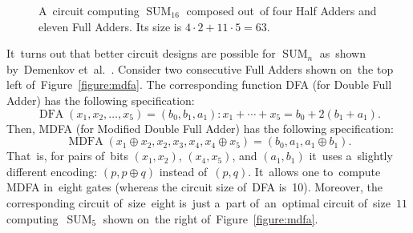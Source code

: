 \documentclass[sigconf, review, anonymous]{acmart}
\DeclareMathOperator{\SUM}{SUM}
\DeclareMathOperator{\MDFA}{MDFA}
\begin{document}
\begin{figure}
    \begin{center}
    \end{center}
    \caption{A~circuit computing $\SUM_{16}$ composed out~of four Half Adders and eleven Full Adders. Its size is $4 \cdot 2 + 11 \cdot 5=63$.}
    \label{figure:sum16fa}
\end{figure}

It~turns out that better circuit designs are possible for $\SUM_n$
as~shown by~Demenkov et~al.~\cite{DBLP:journals/ipl/DemenkovKKY10}.
Consider two consecutive Full Adders shown on~the top left of~Figure~\ref{figure:mdfa}. The corresponding function DFA (for Double Full Adder) has the following specification: \[\operatorname{DFA}(x_1, x_2,\dotsc,x_5)=(b_0,b_1,a_1) \colon x_1+\dotsb+x_5=b_0+2(b_1+a_1).\]
Then, MDFA (for Modified Double Full Adder) has the following specification:
\[\MDFA(x_1 \oplus x_2, x_2, x_3, x_4, x_4 \oplus x_5)=(b_0, a_1, a_1 \oplus b_1).\]
That~is, for pairs of~bits $(x_1, x_2)$, $(x_4, x_5)$, and $(a_1, b_1)$
it~uses a~slightly different encoding: $(p, p \oplus q)$ instead of~$(p,q)$.
It~allows one to~compute MDFA in~eight gates (whereas the circuit size of~DFA is~10). Moreover, the corresponding circuit of~size~eight is~just a~part
of~an~optimal circuit of~size~$11$ computing~$\SUM_5$ shown on~the right
of~Figure~\ref{figure:mdfa}.
\end{document}
